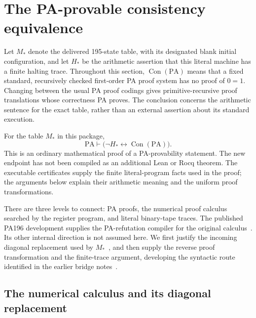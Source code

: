 
\section{The PA-provable consistency equivalence}
\label{sec:pa-calibration}

Let $M_*$ denote the delivered 195-state table, with its designated blank
initial configuration, and let $H_*$ be the arithmetic assertion that this
literal machine has a finite halting trace. Throughout this section,
$\operatorname{Con}(\mathrm{PA})$ means that a fixed standard, recursively
checked first-order PA proof system has no proof of $0=1$. Changing between
the usual PA proof codings gives primitive-recursive proof translations
whose correctness PA proves. The conclusion concerns the arithmetic
sentence for the exact table, rather than an external assertion about its
standard execution.

\begin{theorem}\label{thm:pa-biconditional}
For the table $M_*$ in this package,
\[
 \mathrm{PA}\vdash
 \bigl(\neg H_*\leftrightarrow\operatorname{Con}(\mathrm{PA})\bigr).
\]
This is an ordinary mathematical proof of a PA-provability statement.
The new endpoint has not been compiled as an additional Lean or Rocq
theorem. The executable certificates supply the finite literal-program
facts used in the proof; the arguments below explain their arithmetic
meaning and the uniform proof transformations.
\end{theorem}

There are three levels to connect: PA proofs, the numerical proof calculus
searched by the register program, and literal binary-tape traces. The
published PA196 development supplies the PA-refutation compiler for the
original calculus~\cite{chang}. Its other internal direction is not
assumed here. We first justify the incoming diagonal replacement used
by $M_*$~\cite{diagonal}, and then supply the reverse proof
transformation and the finite-trace argument, developing the syntactic
route identified in the earlier bridge notes~\cite{bridge}.

\subsection{The numerical calculus and its diagonal replacement}

